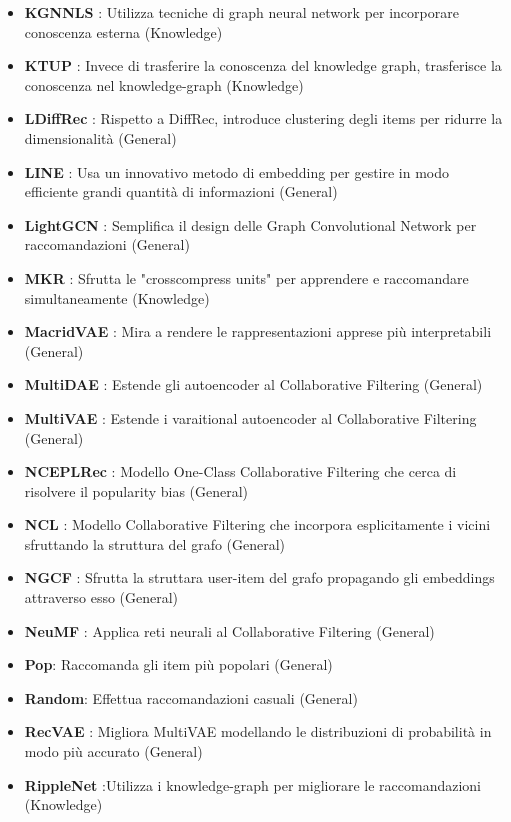 \begin{itemize}
    \item \textbf{KGNNLS} \cite{KGNNLS}: Utilizza tecniche di graph neural network per incorporare conoscenza esterna (Knowledge)
    \item \textbf{KTUP} \cite{KTUP}: Invece di trasferire la conoscenza del knowledge graph, trasferisce la conoscenza nel knowledge-graph (Knowledge)
    \item \textbf{LDiffRec} \cite{LDiffRec}: Rispetto a DiffRec, introduce clustering degli items per ridurre la dimensionalità (General)
    \item \textbf{LINE} \cite{LINE}: Usa un innovativo metodo di embedding per gestire in modo efficiente grandi quantità di informazioni (General)
    \item \textbf{LightGCN} \cite{LightGCN}: Semplifica il design delle Graph Convolutional Network per raccomandazioni (General)
    \item \textbf{MKR} \cite{MKR}: Sfrutta le "crosscompress units" per apprendere e raccomandare simultaneamente (Knowledge)
    \item \textbf{MacridVAE} \cite{MacridVAE}: Mira a rendere le rappresentazioni apprese più interpretabili (General)
    \item \textbf{MultiDAE} \cite{MultiDAE}: Estende gli autoencoder al Collaborative Filtering (General)
    \item \textbf{MultiVAE} \cite{MultiVAE}:  Estende i varaitional autoencoder al Collaborative Filtering (General)
    \item \textbf{NCEPLRec} \cite{NCEPLRec}: Modello One-Class Collaborative Filtering che cerca di risolvere il popularity bias (General)
    \item \textbf{NCL} \cite{NCL}: Modello Collaborative Filtering che incorpora esplicitamente i vicini sfruttando la struttura del grafo (General)
    \item \textbf{NGCF} \cite{NGCF}: Sfrutta la struttara user-item del grafo propagando gli embeddings attraverso esso (General)
    \item \textbf{NeuMF} \cite{NeuMF}: Applica reti neurali al Collaborative Filtering (General)
    \item \textbf{Pop}: Raccomanda gli item più popolari (General)
    \item \textbf{Random}: Effettua raccomandazioni casuali (General)
    \item \textbf{RecVAE} \cite{RecVAE}:  Migliora MultiVAE modellando le distribuzioni di probabilità in modo più accurato (General)
    \item \textbf{RippleNet} \cite{RippleNet}:Utilizza i knowledge-graph per migliorare le raccomandazioni (Knowledge)

\end{itemize}
